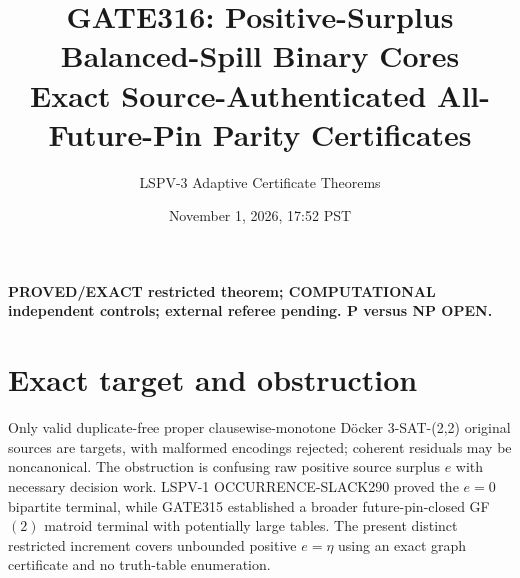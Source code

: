 \documentclass[11pt]{article}
\title{GATE316: Positive-Surplus Balanced-Spill Binary Cores\\Exact Source-Authenticated All-Future-Pin Parity Certificates}
\author{LSPV-3 Adaptive Certificate Theorems}
\date{November 1, 2026, 17:52 PST}
\begin{document}
\maketitle
\noindent\textbf{PROVED/EXACT restricted theorem; COMPUTATIONAL independent controls; external referee pending. P versus NP OPEN.}
\section{Exact target and obstruction}
Only valid duplicate-free proper clausewise-monotone D\"ocker 3-SAT-(2,2) original sources are targets, with malformed encodings rejected; coherent residuals may be noncanonical. The obstruction is confusing raw positive source surplus $e$ with necessary decision work. LSPV-1 OCCURRENCE-SLACK290 proved the $e=0$ bipartite terminal, while GATE315 established a broader future-pin-closed GF$(2)$ matroid terminal with potentially large tables. The present distinct restricted increment covers unbounded positive $e=\eta$ using an exact graph certificate and no truth-table enumeration.
\end{document}

